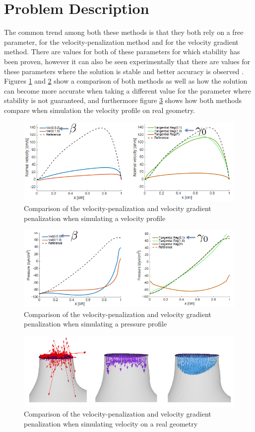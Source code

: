 \section{Problem Description}
The common trend among both these methods is that they both rely on a free parameter, \mathm{\beta} for the velocity-penalization method and \mathm{\gamma} for the velocity gradient method. There are values for both of these parameters for which stability has been proven, however it can also be seen experimentally that there are values for these parameters where the solution is stable and better accuracy is observed \cite{bertoglio2014}. Figures \ref{fig:velocompare} and \ref{fig:presscompare} show a comparison of both methods as well as how the solution can become more accurate when taking a different value for the parameter where stability is not guaranteed, and furthermore figure \ref{fig:flowcompare} shows how both methods compare when simulation the velocity profile on real geometry.\\
\begin{figure}[t]
\centering
\includegraphics[width=12cm]{media/compare.PNG}
\caption{Comparison of the velocity-penalization and velocity gradient penalization when simulating a velocity profile\label{fig:velocompare}}
\end{figure}
\begin{figure}[t]
\centering
\includegraphics[width=12cm]{media/presscompare.PNG}
\caption{Comparison of the velocity-penalization and velocity gradient penalization when simulating a pressure profile\label{fig:presscompare}}
\end{figure}
\begin{figure}[t]
\centering
\includegraphics[width=12cm]{media/flowcomp.PNG}
\caption{Comparison of the velocity-penalization and velocity gradient penalization when simulating velocity on a real geometry\label{fig:flowcompare}}
\end{figure}

